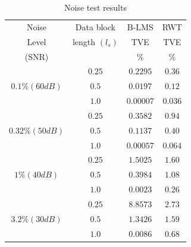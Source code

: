 \documentclass{UCF_ETD}
\begin{document}
\begin{table}[H] 
\renewcommand{\arraystretch}{1.3}
\caption{Noise test results} \label{NoiseTestResultsTable}
\centering
\begin{tabular}{c|c|c|c}
\hline
Noise				&	Data block	  &  B-LMS     &  RWT	  \\
Level			    &  length $(l_s)$ &   TVE	   &  TVE	  \\
(SNR)			    &				  &   $ \%$    &  $ \%$   \\
\hline\hline
			 & 	$ 0.25$		&	$0.2295$		&	$0.36$ \\
\cline{2-4}
$0.1\%(60dB)$&	$ 0.5$		&	$0.0197$		&	$0.12$ \\
\cline{2-4}
			 &	$ 1.0$		&	$0.00007$		&	$0.036$ \\
\hline
			 &	$ 0.25$		&	$0.3582$		&	$0.94$ \\
\cline{2-4}
$0.32\%(50dB)$&	$ 0.5$		&	$0.1137$		&	$0.40$ \\
\cline{2-4}
			 &	$ 1.0$		&	$0.00057$		&	$0.064$ \\
\hline
			 &	$ 0.25$		&	$1.5025$		&	$1.60$ \\
\cline{2-4}
$1\%(40dB)$  &	$ 0.5$	    &	$0.3984$		&	$1.08$ \\
\cline{2-4}
			 &	$ 1.0$		&	$0.0023$		&	$0.26$ \\
\hline
			 &	$ 0.25$		&	$8.8573$		&	$2.73$ \\
\cline{2-4}
$3.2\%(30dB)$&	$ 0.5$		&	$1.3426$		&	$1.59$ \\
\cline{2-4}
			 &	$ 1.0$		&	$0.0086$		&	$0.68$ \\
\hline
\end{tabular}
\end{table}
\end{document}
